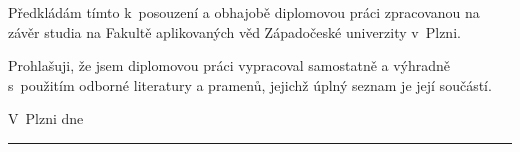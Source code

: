 
\begin{declaration}
Předkládám tímto k~posouzení a obhajobě diplomovou práci zpracovanou na závěr studia na Fakultě aplikovaných věd Západočeské univerzity v~Plzni.

Prohlašuji, že jsem diplomovou práci vypracoval samostatně a výhradně s~použitím odborné literatury a pramenů, jejichž úplný seznam je její součástí.

\vspace{10em}
V~Plzni dne  \hfill \rule[-0.15em]{13em}{0.5pt} %
 
 
\end{declaration}

\cleardoublepage